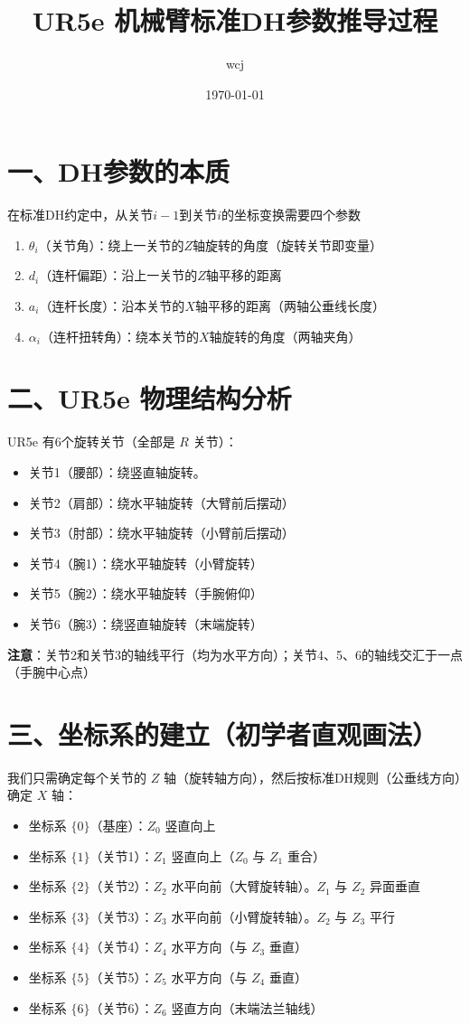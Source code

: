 \documentclass[a4paper,12pt]{article}
\title{UR5e 机械臂标准DH参数推导过程}
\author{wcj}
\date{\today}
\begin{document}
\maketitle

\section*{一、DH参数的本质}
在标准DH约定中，从关节$i-1$到关节$i$的坐标变换需要四个参数
\begin{enumerate}
    \item $\theta_i$（关节角）：绕上一关节的$Z$轴旋转的角度（旋转关节即变量）
    \item $d_i$（连杆偏距）：沿上一关节的$Z$轴平移的距离
    \item $a_i$（连杆长度）：沿本关节的$X$轴平移的距离（两轴公垂线长度）
    \item $\alpha_i$（连杆扭转角）：绕本关节的$X$轴旋转的角度（两轴夹角）
\end{enumerate}

\section*{二、UR5e 物理结构分析}
UR5e 有6个旋转关节（全部是 $R$ 关节）：
\begin{itemize}
    \item 关节1（腰部）：绕竖直轴旋转。
    \item 关节2（肩部）：绕水平轴旋转（大臂前后摆动）
    \item 关节3（肘部）：绕水平轴旋转（小臂前后摆动）
    \item 关节4（腕1）：绕水平轴旋转（小臂旋转）
    \item 关节5（腕2）：绕水平轴旋转（手腕俯仰）
    \item 关节6（腕3）：绕竖直轴旋转（末端旋转）
\end{itemize}
\textbf{注意}：关节2和关节3的轴线平行（均为水平方向）；关节4、5、6的轴线交汇于一点（手腕中心点）

\section*{三、坐标系的建立（初学者直观画法）}
我们只需确定每个关节的 $Z$ 轴（旋转轴方向），然后按标准DH规则（公垂线方向）确定 $X$ 轴：
\begin{itemize}
    \item 坐标系 $\{0\}$（基座）：$Z_0$ 竖直向上
    \item 坐标系 $\{1\}$（关节1）：$Z_1$ 竖直向上（$Z_0$ 与 $Z_1$ 重合）
    \item 坐标系 $\{2\}$（关节2）：$Z_2$ 水平向前（大臂旋转轴）。$Z_1$ 与 $Z_2$ 异面垂直
    \item 坐标系 $\{3\}$（关节3）：$Z_3$ 水平向前（小臂旋转轴）。$Z_2$ 与 $Z_3$ 平行
    \item 坐标系 $\{4\}$（关节4）：$Z_4$ 水平方向（与 $Z_3$ 垂直）
    \item 坐标系 $\{5\}$（关节5）：$Z_5$ 水平方向（与 $Z_4$ 垂直）
    \item 坐标系 $\{6\}$（关节6）：$Z_6$ 竖直方向（末端法兰轴线）
\end{itemize}
\end{document}
